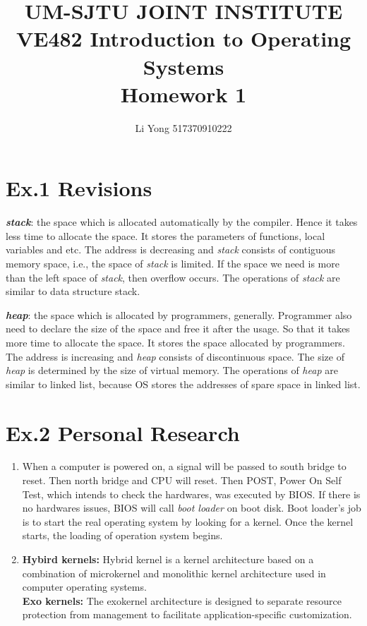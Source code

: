 \documentclass[a4paper]{article}
\title{UM-SJTU JOINT INSTITUTE\\VE482 Introduction to Operating Systems\\\vspace{0.5cm} Homework 1}
\author{Li Yong 517370910222}
\begin{document}
\maketitle
\newpage

\section*{Ex.1 Revisions}
	\textbf{\textit{stack}}: the space which is allocated automatically by the compiler. Hence it takes less time to allocate the space. It stores the parameters of functions, local variables and etc. The address is decreasing and \textit{stack} consists of contiguous memory space, i.e., the space of \textit{stack} is limited. If the space we need is more than the left space of \textit{stack}, then overflow occurs. The operations of \textit{stack} are similar to data structure stack.\par
	\textbf{\textit{heap}}: the space which is allocated by programmers, generally. Programmer also need to declare the size of the space and free it after the usage. So that it takes more time to allocate the space. It stores the space allocated by programmers. The address is increasing and \textit{heap} consists of discontinuous space. The size of \textit{heap} is determined by the size of virtual memory. The operations of \textit{heap} are similar to linked list, because OS stores the addresses of spare space in linked list.

\section*{Ex.2 Personal Research}
	\begin{enumerate}[1.]
		\item When a computer is powered on, a signal will be passed to south bridge to reset. Then north bridge and CPU will reset. Then POST, Power On Self Test, which intends to check the hardwares, was executed by BIOS. If there is no hardwares issues, BIOS will call \textit{boot loader} on boot disk. Boot loader's job is to start the real operating system by looking for a kernel. Once the kernel starts, the loading of operation system begins.
		\item \textbf{Hybird kernels: }Hybrid kernel is a kernel architecture based on a combination of microkernel and monolithic kernel architecture used in computer operating systems.\\
		\textbf{Exo kernels: }The exokernel architecture is designed to separate resource protection from management to facilitate application-specific customization.
	\end{enumerate}
\end{document}

